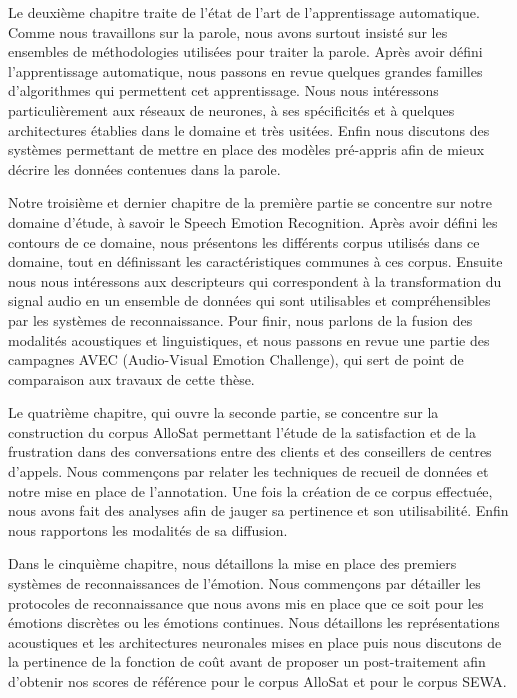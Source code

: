 Le deuxième chapitre traite de l'état de l'art de l'apprentissage automatique. Comme nous travaillons sur la parole, nous avons surtout insisté sur les ensembles de méthodologies utilisées pour traiter la parole. Après avoir défini l'apprentissage automatique, nous passons en revue quelques grandes familles d'algorithmes qui permettent cet apprentissage. Nous nous intéressons particulièrement aux réseaux de neurones, à ses spécificités et à quelques architectures établies dans le domaine et très usitées. Enfin nous discutons des systèmes permettant de mettre en place des modèles pré-appris afin de mieux décrire les données contenues dans la parole.

Notre troisième et dernier chapitre de la première partie se concentre sur notre domaine d'étude, à savoir le Speech Emotion Recognition. Après avoir défini les contours de ce domaine, nous présentons les différents corpus utilisés dans ce domaine, tout en définissant les caractéristiques communes à ces corpus. Ensuite nous nous intéressons aux descripteurs qui correspondent à la transformation du signal audio en un ensemble de données qui sont utilisables et compréhensibles par les systèmes de reconnaissance. Pour finir, nous parlons de la fusion des modalités acoustiques et linguistiques, et nous passons en revue une partie des campagnes AVEC (Audio-Visual Emotion Challenge), qui sert de point de comparaison aux travaux de cette thèse.

Le quatrième chapitre, qui ouvre la seconde partie, se concentre sur la construction du corpus AlloSat permettant l'étude de la satisfaction et de la frustration dans des conversations entre des clients et des conseillers de centres d'appels. Nous commençons par relater les techniques de recueil de données et notre mise en place de l'annotation. Une fois la création de ce corpus effectuée, nous avons fait des analyses afin de jauger sa pertinence et son utilisabilité. Enfin nous rapportons les modalités de sa diffusion.

Dans le cinquième chapitre, nous détaillons la mise en place des premiers systèmes de reconnaissances de l'émotion. Nous commençons par détailler les protocoles de reconnaissance que nous avons mis en place que ce soit pour les émotions discrètes ou les émotions continues. Nous détaillons les représentations acoustiques et les architectures neuronales mises en place puis nous discutons de la pertinence de la fonction de coût avant de proposer un post-traitement afin d'obtenir nos scores de référence pour le corpus AlloSat et pour le corpus SEWA.

